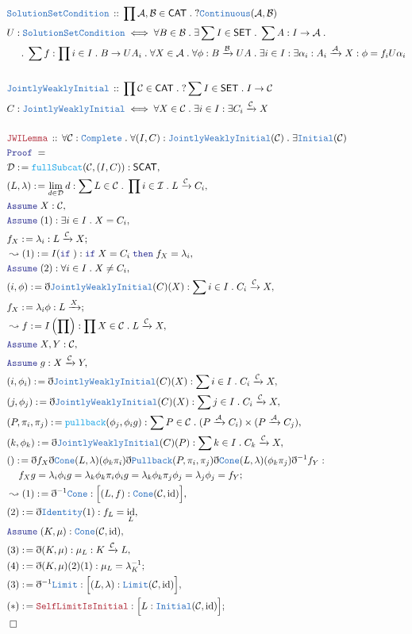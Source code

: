 \documentclass[12pt]{scrartcl}
\newcommand{\TYPE}[1]{\textcolor{NavyBlue}{\mathtt{#1}}}
\newcommand{\FUNC}[1]{\textcolor{Cerulean}{\mathtt{#1}}}
\newcommand{\LOGIC}[1]{\textcolor{Blue}{\mathtt{#1}}}
\newcommand{\THM}[1]{\textcolor{Maroon}{\mathtt{#1}}}
\renewcommand{\.}{\; . \;}
\newcommand{\de}{: \kern 0.1pc =}
\newcommand{\If}{\LOGIC{if} \;}
\newcommand{\Then}{ \; \LOGIC{then} \;}
\newcommand{\Theorem}[2]{& \THM{#1} \, :: \, #2 \\ & \Proof = \\ }
\newcommand{\DeclareType}[2]{& \TYPE{#1} \, :: \, #2 \\}
\newcommand{\DefineType}[3]{& #1 : \TYPE{#2} \iff #3 \\}
\newcommand{\NewLine}{\\ & \kern 1pc}
\newcommand{\Page}[1]{ \begin{align*} #1 \end{align*}   }
\newcommand{ \bd }{ \ByDef }
\DeclareMathOperator*{\id}{id}
\newcommand{\Arrow}{\xrightarrow}
\newcommand{\Say}[3]{& #1 \de #2 : #3, \\}
\newcommand{\Conclude}[3]{& #1 \de #2 : #3; \\}
\newcommand{\Derive}[3]{& \leadsto #1 \de #2 : #3, \\}
\newcommand{\Assume}[2]{& \LOGIC{Assume} \; #1 : #2, \\}
\newcommand{\QED}{\; \square}
\newcommand{\EndProof}{& \QED \\}
\newcommand{\ByDef}{\eth}
\newcommand{\Proof}{\LOGIC{Proof} \; }
\newcommand{\C}{\mathcal{C}}
\newcommand{\A}{\mathcal{A}}
\newcommand{\B}{\mathcal{B}}
\newcommand{\D}{\mathcal{D}}
\newcommand{\I}{\mathcal{I}}
\newcommand{\CAT}{\mathsf{CAT}}
\newcommand{\SET}{\mathsf{SET}}
\begin{document}
\Page{
	\DeclareType{SolutionSetCondition}{ \prod  \A,\B \in \CAT \. ?\TYPE{Continuous}(\A,\B)  }
	\DefineType{U}{SolutionSetCondition}{  
		\forall B \in \B \.  
		\exists 
			\sum I \in \SET  \.  
			\sum A : I \to \A \. \NewLine \.
			\sum f : \prod i \in I \. B \to UA_i \. 
			\forall X \in \A \. \forall \phi : B \Arrow{\B} UA \. \exists  i \in I :
			\exists \alpha_i : A_i \Arrow{\A} X :  \phi = f_i U\alpha_i
	}
	\\
	\DeclareType{JointlyWeaklyInitial}{\prod \C \in \CAT \. ?\sum I \in \SET \. I \to \C  }
	\DefineType{C}{JointlyWeaklyInitial}{\forall X \in \C \. \exists i \in I : \exists C_i \Arrow{\C} X}
	\\
	\Theorem{JWILemma}{
		\forall \C : \TYPE{Complete} \. 
		\forall (I,C) : \TYPE{JointlyWeaklyInitial}(\C)  \. 
		\exists \TYPE{Initial}(\C)	
	}
	\Say{\D}{\FUNC{fullSubcat}(\C,(I,C))}{\mathsf{SCAT}}
	\Say{(L,\lambda)}{\lim_{d \in \D} d}{\sum L \in \C \. \prod i \in \I \. L \Arrow{\C} C_i}
	\Assume{X}{\C}
	\Assume{(1)}{\exists i \in I \. X = C_i}
	\Conclude{f_X}{\lambda_i}{L \Arrow{\C} X}
	\Derive{(1)}{I(\If)}{\If X = C_i \Then f_X = \lambda_i}
	\Assume{(2)}{\forall i \in I \. X \neq C_i}
	\Say{(i,\phi)}{ \bd \TYPE{JointlyWeaklyInitial}(C)(X)  }{\sum i \in I \. C_i \Arrow{\C} X}
	\Conclude{f_X}{\lambda_i \phi}{ L \Arrow X}
	\Derive{f}{I\left(\prod\right)}{\prod X \in \C \. L \Arrow{\C} X }
	\Assume{X,Y}{\C}
	\Assume{g}{X \Arrow{\C} Y}
	\Say{(i,\phi_i)}{\bd \TYPE{JointlyWeaklyInitial}(C)(X)}{\sum i \in I \. C_i \Arrow{\C} X}
	\Say{(j,\phi_j)}{\bd \TYPE{JointlyWeaklyInitial}(C)(X)}{ \sum j \in I \. C_i \Arrow{\C} X}
	\Say{(P,\pi_i,\pi_j)}{\FUNC{pullback}(\phi_j,\phi_i g)}{\sum P \in \C \. (P \Arrow{\A} C_i) \times (P \Arrow{\A} C_j)}
	\Say{(k,\phi_k)  }{ \bd \TYPE{JointlyWeaklyInitial}(C)(P)}{ \sum k \in I \. C_k \Arrow{\C} X }
	\Conclude{()}{\bd f_X \bd \TYPE{Cone}(L,\lambda)(\phi_k\pi_i) \bd \TYPE{Pullback}(P,\pi_i,\pi_j)
		\bd \TYPE{Cone}(L,\lambda)(\phi_k\pi_j) \bd^{-1} f_Y
	}{
		\NewLine
		f_X g =   
		\lambda_i \phi_i g   = 
		\lambda_k \phi_k \pi_i \phi_i  g  =  
		\lambda_k \phi_k \pi_j \phi_j =
		\lambda_j \phi_j = 
		f_Y
		}
	\Derive{(1)}{\bd^{-1}\TYPE{Cone}}{\Big[ (L,f) : \TYPE{Cone}(\C,\id)  \Big]}
	\Say{(2)}{\bd \TYPE{Identity}(1)}{f_L = {\id_L}}
	\Assume{(K,\mu)}{\TYPE{Cone}(\C,\id)}
	\Say{(3)}{\bd (K,\mu)}{\mu_L : K \Arrow{\C} L}
	\Conclude{(4)}{ \bd (K,\mu)(2)(1)}{ \mu_L = \lambda_K^{-1}}
	\Say{(3)}{\bd^{-1} \TYPE{Limit}}{\Big[(L,\lambda) : \TYPE{Limit}(\C,\id)\Big]}
	\Conclude{(*)}{\THM{SelfLimitIsInitial}}{\Big[ L : \TYPE{Initial}(\C,\id) \Big] }
	\EndProof
}
\end{document}
